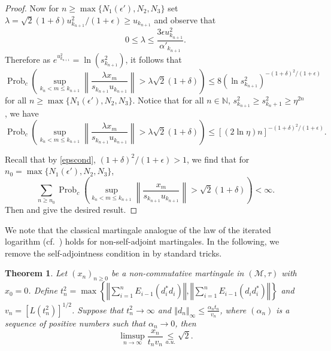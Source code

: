 \documentclass[10pt]{amsart}
\newtheorem{thm}{Theorem}[section]
\theoremstyle{definition}
\theoremstyle{myremark}
\numberwithin{equation}{section}
\def\N{\mathbb N}
\newcommand{\norm}[1]{\left\Vert#1\right\Vert}
\begin{document}
\begin{proof}
    
    Now for $n \geq \max \{ N_1(\epsilon'), N_2, N_3 \}$ 
    set $\lambda = \sqrt2(1 + \delta)u^2_{k_{n+1}} / (1 + \epsilon)\geq u_{k_{n+1}}$ and observe that 
    $$0 \le \lambda \le \frac{3\epsilon u_{k_{n+1}}^2}{\alpha'_{k_{n+1}}}. $$
        Therefore { as $e^{u_{k_{n+1}}^2}=\ln(s_{k_{n+1}}^2)$}, it follows that
    $$
    \operatorname{Prob}_c\left( \sup_{k_n < m \le k_{n+1}} \left\| \frac{\lambda x_m}{s_{k_{n+1}} u_{k_{n+1}}} \right\| > \lambda \sqrt2(1 + \delta) \right)
    \le 8\left( \ln s^2_{k_{n+1}} \right)^{- (1+\delta)^2/(1+\epsilon)}
    $$
    for all $n \ge \max \{N_1(\epsilon'), N_2, N_3 \}$. Notice that for all $n \in \N$,  $s^2_{k_{n+1}} \ge s^2_{k_n + 1} \ge \eta^{2n}$, we have
    $$
    \operatorname{Prob}_c\left( \sup_{k_n < m \le k_{n+1}} \left\| \frac{\lambda x_m}{s_{k_{n+1}} u_{k_{n+1}}} \right\| > \lambda \sqrt{2}(1 + \delta) \right)
    \le \left[ (2 \ln \eta)n \right]^{- (1 + \delta)^2 / (1 + \epsilon)}.
    $$
    
Recall that by \eqref{epscond},  $(1 + \delta)^2 / (1 + \epsilon) > 1$, we find that for $n_0 = \max\{N_1(\epsilon'), N_2, N_3 \}$,
    $$
    \sum_{n \ge n_0} \operatorname{Prob}_c\left( \sup_{k_n < m \le k_{n+1}} \left\| \frac{x_m}{s_{k_{n+1}} u_{k_{n+1}}} \right\| > \sqrt2(1 + \delta) \right) < \infty.
    $$
    Then  and  give the desired result.
\end{proof}
We note that the classical martingale analogue of the law of the iterated logarithm 
(cf.~\cite{stout1970martingale}) holds for non-self-adjoint martingales.  In the following, we remove the self-adjointness condition in  { by standard tricks.} 
\begin{thm}\label{trick}
    Let $(x_n)_{n \geq 0}$ be a non-commutative martingale in $(\mathcal{M}, \tau)$ with $x_0 = 0$. Define \newline $t_n^2 = \max\left\{\norm{\sum_{i=1}^n E_{i-1}(d_i^*d_i)},\norm{\sum_{i=1}^n E_{i-1}(d_id_i^*)}\right\}$ and $v_n = [L(t_n^2)]^{1/2}$. Suppose that $t_n^2 \to \infty$ and $\norm{d_n}_\infty \leq \frac{\alpha_n t_n}{v_n}$, where $(\alpha_n)$ is a sequence of positive numbers such that $\alpha_n \to 0$, then 
    $$
    \limsup_{n \to \infty} \frac{x_n}{t_n v_n} \underset{a.u.}{\leq }\sqrt{2}.
    $$
\end{thm}
\end{document}
